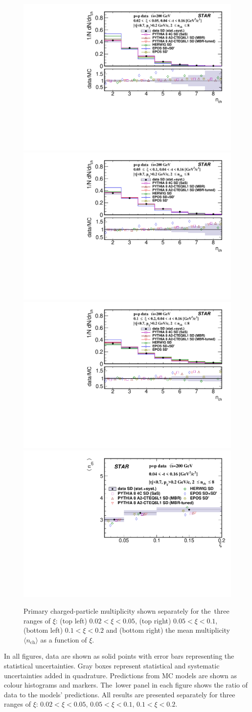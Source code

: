 \begin{figure}[h!]
	\centering
	\includegraphics[width=.49\textwidth,page=1]{chapters/chrgSTAR/img/results/nch_ksi_0.pdf}
	\hfill
	\includegraphics[width=.49\textwidth,page=1]{chapters/chrgSTAR/img/results/nch_ksi_1.pdf}
	\newline
	\includegraphics[width=.49\textwidth,page=1]{chapters/chrgSTAR/img/results/nch_ksi_2.pdf}
	\hfill
	\includegraphics[width=.49\textwidth,page=1]{chapters/chrgSTAR/img/results/mean_nch_xi.pdf}
	\caption{Primary charged-particle multiplicity shown separately for the~three ranges of  $\xi$: (top left) $0.02<\xi<0.05$, (top right) $0.05<\xi<0.1$, (bottom left) $0.1<\xi<0.2$ and (bottom right) the mean multiplicity $\langle n_\textrm{ch}\rangle$ as a function of $\xi$.}
	\label{fig:results_star_nch}
\end{figure}
In all figures, data are shown as solid points with error bars representing the statistical uncertainties. Gray boxes represent statistical and systematic uncertainties added in quadrature. Predictions from MC models are shown as colour histograms and markers. The~lower panel in each figure shows the ratio of data to the models' predictions. All results are presented separately for three ranges of $\xi$: $0.02 < \xi<0.05$, $0.05<\xi<0.1$, $0.1<\xi<0.2$.

